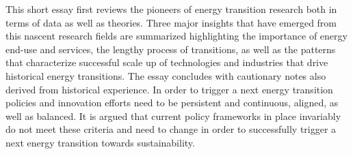 This short essay first reviews the pioneers of energy transition research both in terms of data as well as theories. Three major insights that have emerged from this nascent research fields are summarized highlighting the importance of energy end-use and services, the lengthy process of transitions, as well as the patterns that characterize successful scale up of technologies and industries that drive historical energy transitions. The essay concludes with cautionary notes also derived from historical experience. In order to trigger a next energy transition policies and innovation efforts need to be persistent and continuous, aligned, as well as balanced. It is argued that current policy frameworks in place invariably do not meet these criteria and need to change in order to successfully trigger a next energy transition towards sustainability.